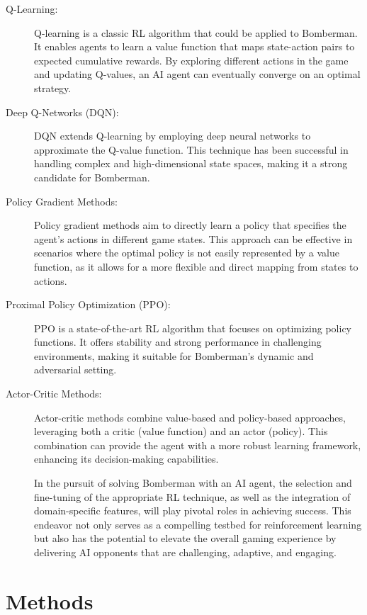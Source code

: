 \documentclass[a4paper,12pt,headsepline, fleqn, english]{scrartcl}%
\begin{document}
	\begin{description}
	\item[Q-Learning:] Q-learning is a classic RL algorithm that could be applied to Bomberman. 
	It enables agents to learn a value function that maps state-action pairs to expected 
	cumulative rewards. By exploring different actions in the game and updating Q-values, 
	an AI agent can eventually converge on an optimal strategy.

	\item[Deep Q-Networks (DQN):] DQN extends Q-learning by employing deep neural networks 
	to approximate the Q-value function. This technique has been successful in handling 
	complex and high-dimensional state spaces, making it a strong candidate for Bomberman.

	\item[Policy Gradient Methods:] Policy gradient methods aim to directly learn a policy 
	that specifies the agent's actions in different game states. This approach can be 
	effective in scenarios where the optimal policy is not easily represented by a value function, 
	as it allows for a more flexible and direct mapping from states to actions.

	\item[Proximal Policy Optimization (PPO):] PPO is a state-of-the-art RL algorithm that focuses 
	on optimizing policy functions. It offers stability and strong performance in challenging 
	environments, making it suitable for Bomberman's dynamic and adversarial setting.

	\item[Actor-Critic Methods:] Actor-critic methods combine value-based and policy-based approaches, 
	leveraging both a critic (value function) and an actor (policy). This combination can provide the 
	agent with a more robust learning framework, enhancing its decision-making capabilities.

	In the pursuit of solving Bomberman with an AI agent, the selection and fine-tuning 
	of the appropriate RL technique, as well as the integration of domain-specific features, will 
	play pivotal roles in achieving success. This endeavor not only serves as a compelling testbed for 
	reinforcement learning but also has the potential to elevate the overall gaming experience 
	by delivering AI opponents that are challenging, adaptive, and engaging.
	\end{description}
	
	\section{Methods}
	
\end{document}
